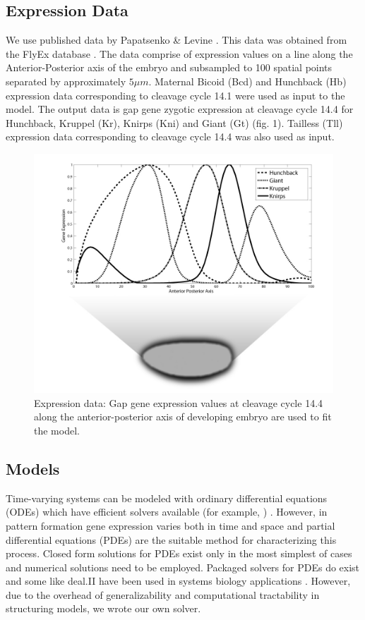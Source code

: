 \subsection{Expression Data}

We use published data by Papatsenko \& Levine \cite{papatsenko11}. This data was obtained from the FlyEx database \cite{pisarev09}. The data comprise of expression values on a line along the Anterior-Posterior axis of the embryo and subsampled to 100 spatial points separated by approximately $5\mu m$. Maternal Bicoid (Bcd) and Hunchback (Hb) expression data corresponding to cleavage cycle 14.1 were used as input to the model. The output data is gap gene zygotic expression at cleavage cycle 14.4 for Hunchback, Kruppel (Kr), Knirps (Kni) and Giant (Gt) (fig. 1). Tailless (Tll) expression data corresponding to cleavage cycle 14.4 was also used as input. 

\begin{figure}
    \centering
    \includegraphics[scale = 3.0]{tex/embryo/figure-1.jpg}
    \caption{Expression data: Gap gene expression values at cleavage cycle 14.4 along the anterior-posterior axis of developing embryo are used to fit the model.}
    \label{fig:figure-1}
\end{figure}

\subsection{Models}

Time-varying systems can be modeled with ordinary differential equations (ODEs) which have efficient solvers available (for example, \cite{hindmarsh05}) . However, in pattern formation gene expression varies both in time and space and partial differential equations (PDEs) are the suitable method for characterizing this process. Closed form solutions for PDEs exist only in the most simplest of cases and numerical solutions need to be employed. Packaged solvers for PDEs do exist \cite{GWAT:GWAT584} and some like deal.II \cite{Bangerth2007} have been used in systems biology applications \cite{garikipati2017, murphy2018, albert2014}. However, due to the overhead of generalizability and computational tractability in structuring models, we wrote our own solver.

